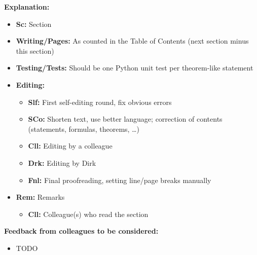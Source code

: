 \clearpage

\noindent
\textbf{Explanation:}

\begin{itemize}
  \item
  \textbf{Sc:}
  Section
  
  \item
  \textbf{Writing/Pages:}
  As counted in the Table of Contents
  (next section minus this section)
  
  \item
  \textbf{Testing/Tests:}
  Should be one Python unit test per theorem-like statement
  
  \item
  \textbf{Editing:}
  \begin{itemize}
    \item
    \textbf{Slf:}
    First self-editing round, fix obvious errors
    
    \item
    \textbf{SCo:}
    Shorten text, use better language;
    correction of contents (statements, formulas, theorems, \dots)
    
    \item
    \textbf{Cll:}
    Editing by a colleague
    
    \item
    \textbf{Drk:}
    Editing by Dirk
    
    \item
    \textbf{Fnl:}
    Final proofreading, setting line/page breaks manually
  \end{itemize}
  
  \item
  \textbf{Rem:}
  Remarks
  \begin{itemize}
    \item
    \textbf{Cll:}
    Colleague(s) who read the section
  \end{itemize}
\end{itemize}

\noindent
\textbf{Feedback from colleagues to be considered:}

\begin{itemize}
  \item
  TODO
\end{itemize}

\cleardoublepage
